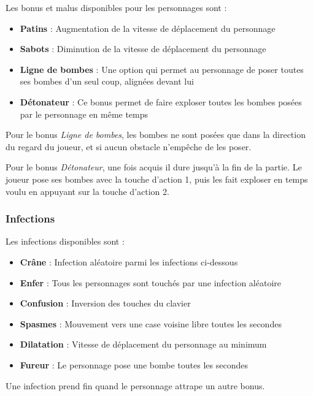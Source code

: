 Les bonus et malus disponibles pour les personnages sont :
\begin{itemize}
\item \textbf{Patins} : Augmentation de la vitesse de déplacement du personnage
\item \textbf{Sabots} : Diminution de la vitesse de déplacement du personnage
\item \textbf{Ligne de bombes} : Une option qui permet au personnage de poser toutes ses bombes d'un seul coup, alignées devant lui
\item \textbf{Détonateur} : Ce bonus permet de faire exploser toutes les bombes posées par le personnage en même temps
\end{itemize}

\vspace{0.3cm}

Pour le bonus \textit{Ligne de bombes}, les bombes ne sont posées que dans la direction du regard du joueur, et si aucun obstacle n'empêche de les poser. 

Pour le bonus \textit{Détonateur}, une fois acquis il dure jusqu'à la fin de la partie. Le joueur pose ses bombes avec la touche d'action 1, puis les fait exploser en temps voulu en appuyant sur la touche d'action 2.

\subsubsection{Infections}

Les infections disponibles sont :
\begin{itemize}
\item \textbf{Crâne} : Infection aléatoire parmi les infections ci-dessous
\item \textbf{Enfer} : Tous les personnages sont touchés par une infection aléatoire
\item \textbf{Confusion} : Inversion des touches du clavier
\item \textbf{Spasmes} : Mouvement vers une case voisine libre toutes les \nbSecondes secondes
\item \textbf{Dilatation} : Vitesse de déplacement du personnage au minimum
\item \textbf{Fureur} : Le personnage pose une bombe toutes les \nbSecondes secondes
\end{itemize}

\vspace{0.3cm}

Une infection prend fin quand le personnage attrape un autre bonus.

